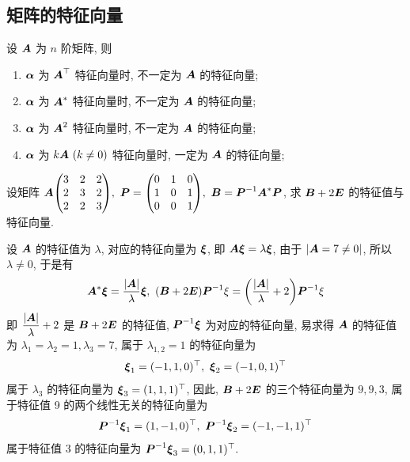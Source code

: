 \subsection{矩阵的特征向量}

\begin{theorem}
    设 $\vb*{A}$ 为 $n$ 阶矩阵, 则 
    \begin{enumerate}[label=(\arabic{*})]
        \item $\vb*{\alpha}$ 为 $\vb*{A}^\top$ 特征向量时, 不一定为 $\vb*{A}$ 的特征向量;
        \item $\vb*{\alpha}$ 为 $\vb*{A}^*$ 特征向量时, 不一定为 $\vb*{A}$ 的特征向量;
        \item $\vb*{\alpha}$ 为 $\vb*{A}^2$ 特征向量时, 不一定为 $\vb*{A}$ 的特征向量;
        \item $\vb*{\alpha}$ 为 $k\vb*{A}~(k\neq0)$ 特征向量时, 一定为 $\vb*{A}$ 的特征向量;
    \end{enumerate}
\end{theorem}

\begin{example}
    设矩阵 $\vb*{A}\mqty(3&2&2\\2&3&2\\2&2&3),~\vb*{P}=\mqty(0&1&0\\1&0&1\\0&0&1),~\vb*{B}=\vb*{P}^{-1}\vb*{A}^*\vb*{P}$, 求 $\vb*{B}+2\vb*{E}$ 的特征值与特征向量.
\end{example}
\begin{solution}
    设 $\vb*{A}$ 的特征值为 $\lambda$, 对应的特征向量为 $\vb*{\xi}$, 即 $\vb*{A\xi}=\lambda\vb*{\xi}$, 由于 $|\vb*{A}=7\neq0|$, 所以 $\lambda\neq0$, 于是有 
    $$\vb*{A}^*\vb*{\xi}=\dfrac{|\vb*{A}|}{\lambda}\vb*{\xi},~(\vb*{B}+2\vb*{E})\vb*{P}^{-1}\xi=\qty(\dfrac{|\vb*{A}|}{\lambda}+2)\vb*{P}^{-1}\xi$$
    即 $\dfrac{|\vb*{A}|}{\lambda}+2$ 是 $\vb*{B}+2\vb*{E}$ 的特征值, $\vb*{P}^{-1}\vb*{\xi}$ 为对应的特征向量, 
    易求得 $\vb*{A}$ 的特征值为 $\lambda_1=\lambda_2=1,\lambda_3=7$, 属于 $\lambda_{1,2}=1$ 的特征向量为 
    $$\vb*{\xi}_1=(-1,1,0)^\top,~\vb*{\xi}_2=(-1,0,1)^\top$$
    属于 $\lambda_3$ 的特征向量为 $\vb*{\xi}_3=(1,1,1)^\top$, 因此, $\vb*{B}+2\vb*{E}$ 的三个特征向量为 $9,9,3$, 属于特征值 9 的两个线性无关的特征向量为 
    $$\vb*{P}^{-1}\vb*{\xi}_1=(1,-1,0)^\top,~\vb*{P}^{-1}\vb*{\xi}_2=(-1,-1,1)^\top$$
    属于特征值 3 的特征向量为 $\vb*{P}^{-1}\vb*{\xi}_3=(0,1,1)^\top.$
\end{solution}

